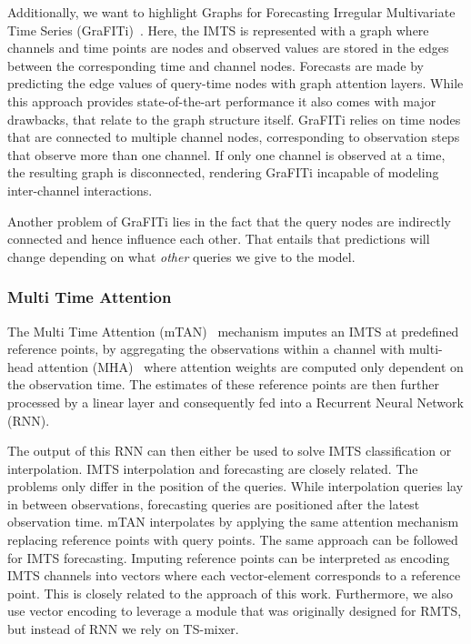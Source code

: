 Additionally, we want to highlight Graphs for Forecasting Irregular Multivariate Time Series (GraFITi)~\cite{Yalavarthi2023.Forecasting}. 
Here, the IMTS is represented with a graph where channels and time points are nodes and observed values are stored in the edges between the corresponding time and channel nodes. 
Forecasts are made by predicting the edge values of query-time nodes with graph attention layers. 
While this approach provides state-of-the-art performance it also comes with major drawbacks, that relate to the graph structure itself. 
GraFITi relies on time nodes that are connected to multiple channel nodes, corresponding to observation steps that observe more than one channel. 
If only one channel is observed at a time, the resulting graph is disconnected, rendering GraFITi incapable of modeling inter-channel interactions. 

Another problem of GraFITi lies in the fact that the query nodes are indirectly connected and hence influence each other. 
That entails that predictions will change depending on what \emph{other} queries we give to the model. 

\subsubsection{Multi Time Attention}\label{sec:mTAN}
The Multi Time Attention (mTAN)~\cite{Shukla2020.MultiTime} mechanism imputes an IMTS at predefined reference points, by aggregating the observations within a channel with multi-head attention (MHA)~\cite{Vaswani2017.Attention} where attention weights are computed only dependent on the observation time.
The estimates of these reference points are then further processed by a linear layer and consequently fed into a Recurrent Neural Network (RNN). 

The output of this RNN can then either be used to solve IMTS classification or interpolation. IMTS interpolation and forecasting are closely related. 
The problems only differ in the position of the queries.
While interpolation queries lay in between observations, forecasting queries are positioned after the latest observation time. 
mTAN interpolates by applying the same attention mechanism replacing reference points with query points. 
The same approach can be followed for IMTS forecasting. 
Imputing reference points can be interpreted as encoding IMTS channels into vectors where each vector-element corresponds to a reference point.
This is closely related to the approach of this work. 
Furthermore, we also use vector encoding to leverage a module that was originally designed for RMTS, but instead of RNN we rely on TS-mixer.


